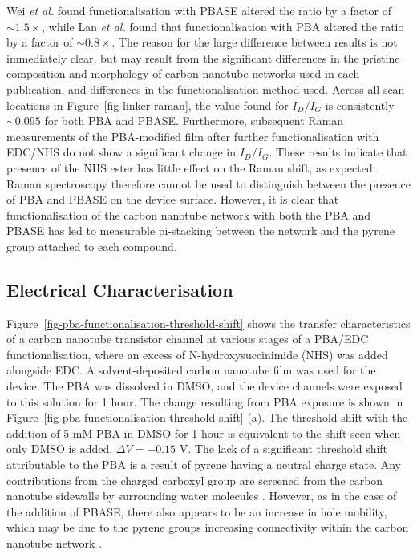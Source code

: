 \documentclass[
  a4paper,
]{scrbook}
\begin{document}
Wei \emph{et al.} \autocite{Wei2010} found functionalisation with PBASE
altered the ratio by a factor of \(\sim 1.5 \times\), while Lan \emph{et
al.} \autocite{Lan2013} found that functionalisation with PBA altered
the ratio by a factor of \(\sim 0.8 \times\). The reason for the large
difference between results is not immediately clear, but may result from
the significant differences in the pristine composition and morphology
of carbon nanotube networks used in each publication, and differences in
the functionalisation method used. Across all scan locations in
Figure~\ref{fig-linker-raman}, the value found for \(I_D/I_G\) is
consistently \(\sim 0.095\) for both PBA and PBASE. Furthermore,
subsequent Raman measurements of the PBA-modified film after further
functionalisation with EDC/NHS do not show a significant change in
\(I_D/I_G\). These results indicate that presence of the NHS ester has
little effect on the Raman shift, as expected. Raman spectroscopy
therefore cannot be used to distinguish between the presence of PBA and
PBASE on the device surface. However, it is clear that functionalisation
of the carbon nanotube network with both the PBA and PBASE has led to
measurable pi-stacking between the network and the pyrene group attached
to each compound.

\hypertarget{sec-PBA-characterisation}{%
\subsection{Electrical
Characterisation}\label{sec-PBA-characterisation}}

Figure~\ref{fig-pba-functionalisation-threshold-shift} shows the
transfer characteristics of a carbon nanotube transistor channel at
various stages of a PBA/EDC functionalisation, where an excess of
N-hydroxysuccinimide (NHS) was added alongside EDC. A solvent-deposited
carbon nanotube film was used for the device. The PBA was dissolved in
DMSO, and the device channels were exposed to this solution for 1 hour.
The change resulting from PBA exposure is shown in
Figure~\ref{fig-pba-functionalisation-threshold-shift} (a). The
threshold shift with the addition of 5 mM PBA in DMSO for 1 hour is
equivalent to the shift seen when only DMSO is added,
\(\Delta V = -0.15\) V. The lack of a significant threshold shift
attributable to the PBA is a result of pyrene having a neutral charge
state. Any contributions from the charged carboxyl group are screened
from the carbon nanotube sidewalls by surrounding water molecules
\autocite{Lerner2012}. However, as in the case of the addition of PBASE,
there also appears to be an increase in hole mobility, which may be due
to the pyrene groups increasing connectivity within the carbon nanotube
network \autocite{Murugathas2019a}.
\end{document}

